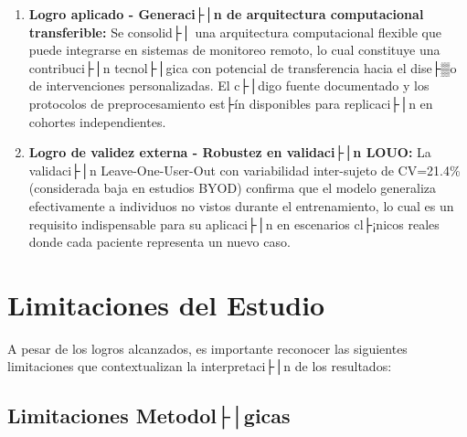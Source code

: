 \begin{enumerate}
    \item \textbf{Logro aplicado - Generaci├│n de arquitectura computacional transferible:} Se consolid├│ una arquitectura computacional flexible que puede integrarse en sistemas de monitoreo remoto, lo cual constituye una contribuci├│n tecnol├│gica con potencial de transferencia hacia el dise├▒o de intervenciones personalizadas. El c├│digo fuente documentado y los protocolos de preprocesamiento est├ín disponibles para replicaci├│n en cohortes independientes.
    
    \item \textbf{Logro de validez externa - Robustez en validaci├│n LOUO:} La validaci├│n Leave-One-User-Out con variabilidad inter-sujeto de CV=21.4\% (considerada baja en estudios BYOD) confirma que el modelo generaliza efectivamente a individuos no vistos durante el entrenamiento, lo cual es un requisito indispensable para su aplicaci├│n en escenarios cl├¡nicos reales donde cada paciente representa un nuevo caso.
\end{enumerate}


\section{Limitaciones del Estudio}
\label{sec:limitaciones}

A pesar de los logros alcanzados, es importante reconocer las siguientes limitaciones que contextualizan la interpretaci├│n de los resultados:

\subsection{Limitaciones Metodol├│gicas}
\label{subsec:limitaciones_metodologicas}

